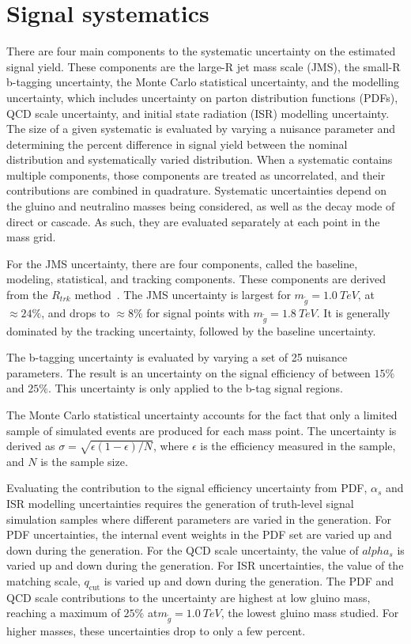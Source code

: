 \chapter{Signal systematics}\label{ch:signal_systematics}

There are four main components to the systematic uncertainty on the estimated signal yield.
These components are the large-R jet mass scale (JMS), the small-R b-tagging uncertainty, the Monte Carlo statistical uncertainty, and the modelling uncertainty, which includes uncertainty on parton distribution functions (PDFs), QCD scale uncertainty, and initial state radiation (ISR) modelling uncertainty.
The size of a given systematic is evaluated by varying a nuisance parameter and determining the percent difference in signal yield between the nominal distribution and systematically varied distribution.
When a systematic contains multiple components, those components are treated as uncorrelated, and their contributions are combined in quadrature.
Systematic uncertainties depend on the gluino and neutralino masses being considered, as well as the decay mode of direct or cascade.
As such, they are evaluated separately at each point in the mass grid.

For the JMS uncertainty, there are four components, called the baseline, modeling, statistical, and tracking components.
These components are derived from the $R_{trk}$ method~\cite{jet-substructure-perf}.
The JMS uncertainty is largest for $m_{\tilde{g}}=1.0~TeV$, at $\approx 24\%$, and drops to $\approx 8\%$ for signal points with $m_{\tilde{g}}=1.8~TeV$.
It is generally dominated by the tracking uncertainty, followed by the baseline uncertainty.

The b-tagging uncertainty is evaluated by varying a set of 25 nuisance parameters.
The result is an uncertainty on the signal efficiency of between $15\%$ and $25\%$.
This uncertainty is only applied to the b-tag signal regions.

The Monte Carlo statistical uncertainty accounts for the fact that only a limited sample of simulated events are produced for each mass point.
The uncertainty is derived as $\sigma=\sqrt{\epsilon(1-\epsilon)/N}$, where $\epsilon$ is the efficiency measured in the sample, and $N$ is the sample size.

Evaluating the contribution to the signal efficiency uncertainty from PDF, $\alpha_s$ and ISR modelling uncertainties requires the generation of truth-level signal simulation samples where different parameters are varied in the generation.
For PDF uncertainties, the internal event weights in the PDF set are varied up and down during the generation.
For the QCD scale uncertainty, the value of $alpha_s$ is varied up and down during the generation.
For ISR uncertainties, the value of the matching scale, $q_{\textrm{cut}}$ is varied up and down during the generation.
The PDF and QCD scale contributions to the uncertainty are highest at low gluino mass, reaching a maximum of $25\%$ at$m_{\tilde{g}}=1.0~TeV$, the lowest gluino mass studied.
For higher masses, these uncertainties drop to only a few percent.
